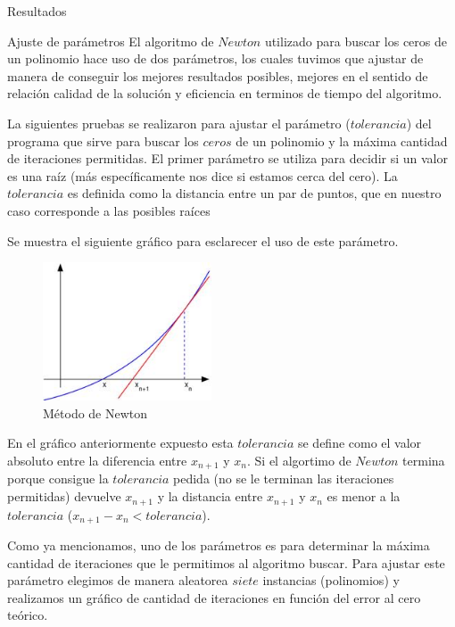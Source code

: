 \begin{section}{Resultados}
	\begin{subsection}{Ajuste de parámetros}
		El algoritmo de $Newton$ utilizado para buscar los ceros de un polinomio hace uso de dos parámetros, los cuales tuvimos que ajustar de manera de conseguir los mejores resultados posibles, mejores en el sentido de relación calidad de la solución y eficiencia en terminos de tiempo del algoritmo.

		La siguientes pruebas se realizaron para ajustar el parámetro ($tolerancia$) del programa que sirve para buscar los $ceros$ de un polinomio y la máxima cantidad de iteraciones permitidas. El primer parámetro se utiliza para decidir si un valor es una raíz (más específicamente nos dice si estamos cerca del cero). La $tolerancia$ es definida como la distancia entre un par de puntos, que en nuestro caso corresponde a las posibles raíces
		
		Se muestra el siguiente gráfico para esclarecer el uso de este parámetro.
		
		\begin{figure}[H]
		  \centering
			\includegraphics[width=5cm]{graficos/newton.jpg}
		  \caption{Método de Newton}
		  \label{fig:newton}
		\end{figure}
		
		En el gráfico anteriormente expuesto esta $tolerancia$ se define como el valor absoluto entre la diferencia entre $x_{n+1}$ y $x_n$. 
		Si el algortimo de $Newton$ termina porque consigue la $tolerancia$ pedida (no se le terminan las iteraciones permitidas) devuelve $x_{n+1}$ y la distancia entre $x_{n+1}$ y $x_n$ es menor a la $tolerancia$ ($x_{n+1} - x_n < tolerancia$).
				
		Como ya mencionamos, uno de los parámetros es para determinar la máxima cantidad de iteraciones que le permitimos al algoritmo buscar. 
		Para ajustar este parámetro elegimos de manera aleatorea $siete$ instancias (polinomios) y realizamos un gráfico de cantidad de iteraciones en función del error al cero teórico.


\end{subsection}
\end{section}
